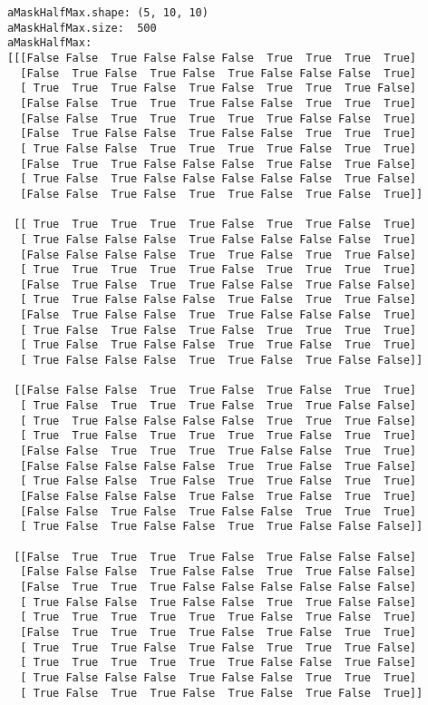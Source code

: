 \documentclass[11pt]{article}
\begin{document}
    \begin{Verbatim}[commandchars=\\\{\}]
aMaskHalfMax.shape: (5, 10, 10)
aMaskHalfMax.size:  500
aMaskHalfMax:
[[[False False  True False False False  True  True  True  True]
  [False  True False  True False  True False False False  True]
  [ True  True  True False  True False  True  True  True False]
  [False False  True  True  True False False  True  True  True]
  [False False  True  True  True  True  True False False  True]
  [False  True False False  True False False  True  True  True]
  [ True False False  True  True  True  True False  True  True]
  [False  True  True False False False  True False  True False]
  [ True False  True False False False False False  True False]
  [False False  True False  True  True False  True False  True]]

 [[ True  True  True  True  True False  True  True False  True]
  [ True False False False  True False False False False  True]
  [False False False False  True  True False  True  True False]
  [ True  True  True  True  True False  True  True  True  True]
  [False  True False  True  True False False  True False False]
  [ True  True False False False  True False  True  True False]
  [False  True False False  True  True False False False  True]
  [ True False  True False  True False  True  True  True  True]
  [ True False  True False False  True  True False  True  True]
  [ True False False False  True  True False  True False False]]

 [[False False False  True  True False  True False  True  True]
  [ True False  True  True  True False  True  True False False]
  [ True  True False False False False  True  True  True False]
  [ True  True False  True  True  True  True False  True  True]
  [False False  True  True  True  True False False  True  True]
  [False False False False False  True  True False  True False]
  [ True False False  True False  True  True False  True  True]
  [False False False False  True False  True False  True  True]
  [False False  True False  True False False  True  True  True]
  [ True False  True False False  True  True False False False]]

 [[False  True  True  True  True False  True False False False]
  [False False False  True False False  True  True False False]
  [False  True  True  True False False False False False False]
  [ True False False  True False False  True  True False False]
  [ True  True  True  True  True  True False  True False  True]
  [False  True  True  True  True False  True False  True  True]
  [ True  True  True False  True False  True  True  True False]
  [ True  True  True  True  True  True False False  True False]
  [ True False False False  True False False  True  True  True]
  [ True False  True  True False  True False  True False  True]]


\end{Verbatim}
\end{document}
